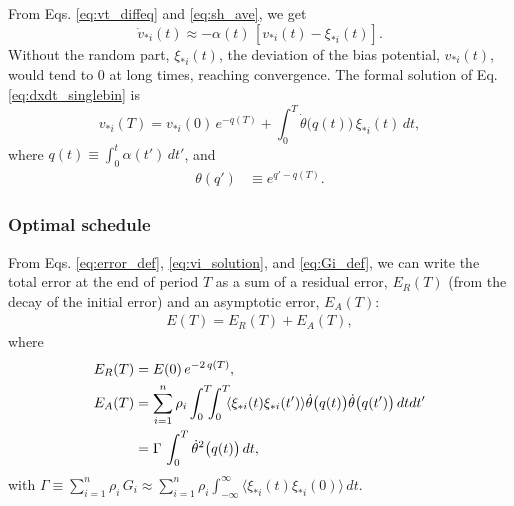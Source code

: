 \documentclass[reprint, superscriptaddress, floatfix]{revtex4-1}
\newcommand{\Err}{E}
\begin{document}
From Eqs.
\eqref{eq:vt_diffeq} and \eqref{eq:sh_ave},
we get %
%
\begin{equation}
  \dot v_{*i}(t)
  \approx
  -\alpha(t) \, \left[ v_{*i}(t) - \xi_{*i}(t) \right]
  .
  \label{eq:dxdt_singlebin}
\end{equation}
%
Without the random part, $\xi_{*i}(t)$,
the deviation of the bias potential, $v_{*i}(t)$,
would tend to $0$ at long times, reaching convergence.
%
The formal solution of Eq. \eqref{eq:dxdt_singlebin} is
%
\begin{equation}
  v_{*i}(T)
  =
  v_{*i}(0) \, e^{-q(T)}
  +
  \int_0^T
    \dot{\theta}\bigl( q(t) \bigr) \, \xi_{*i}(t) \, dt,
  \label{eq:vi_solution}
\end{equation}
%
where
%
$q(t) \equiv \int_0^t \alpha(t') \, dt'$,
%
and
%
\begin{align}
  \theta(q')
  &\equiv
  e^{q' - q(T)}.
  \label{eq:theta_def}
\end{align}



\subsubsection{Optimal schedule}



From Eqs. \eqref{eq:error_def},
\eqref{eq:vi_solution}, and
\eqref{eq:Gi_def},
we can write the total error at the end of period $T$
as a sum of a residual error, $E_R(T)$ (from the decay of the initial error)
and an asymptotic error, $E_A(T)$:
%
\begin{align}
  \Err(T)
  =
  \Err_R(T) + \Err_A(T)
  ,
  \label{eq:error_tot}
\end{align}
%
where
\begin{align}
  \Err_R(T)
  &= \Err(0) \, e^{-2 \, q(T)}
  ,
  \label{eq:ER_sbin}
  \\
  \Err_A(T)
  &=
  \sum_{i=1}^n \rho_i
    \int_0^T\!\!\!\int_0^T
    \!\!
    \langle
      \xi_{*i}(t) \xi_{*i}(t')
    \rangle
    \dot \theta\bigl( q(t) \bigr)
    \dot \theta\bigl( q(t') \bigr)
    \, dt dt'
  \notag \\
  &= \Gamma \, \int_0^T \dot \theta^2\bigl( q(t) \bigr) \, dt
  ,
  \label{eq:EA_sbin}
\end{align}
with
$\Gamma \equiv \sum_{i=1}^n \rho_i \, G_i
\approx \sum_{i=1}^n \rho_i \int_{-\infty}^{\infty} \langle \xi_{*i}(t) \xi_{*i}(0) \rangle \, dt$.
\end{document}
